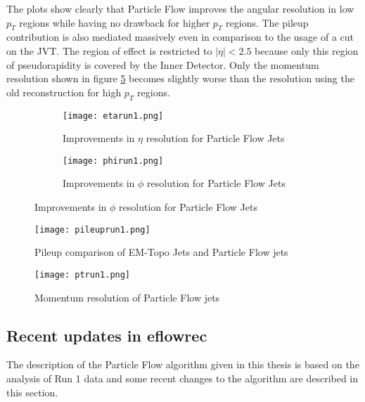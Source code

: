 The plots show clearly that Particle Flow improves the angular resolution in low $p_T$ regions while having no drawback for higher $p_T$ regions. The pileup contribution is also mediated massively even in comparison to the usage of a cut on the JVT. The region of effect is restricted to $|\eta|<\num{2.5}$ because only this region of pseudorapidity is covered by the Inner Detector. Only the momentum resolution shown in figure \ref{fig:ptrun1} becomes slightly worse than the resolution using the old reconstruction for high $p_T$ regions.

\begin{figure}[h]
  \centering
  \begin{subfigure}[b]{0.5\figwidth}
  \texttt{[image: etarun1.png]}
  \caption[Improvements in $\eta$ resolution for Particle Flow Jets]{Improvements in $\eta$ resolution for Particle Flow Jets \cite{pflow16}}
  \label{fig:etarun1}
  \end{subfigure}
  \begin{subfigure}[b]{0.5\figwidth}
  \texttt{[image: phirun1.png]}
  \caption[Improvements in $\phi$ resolution for Particle Flow Jets]{Improvements in $\phi$ resolution for Particle Flow Jets \cite{pflow16}}
  \label{fig:phirun1}
  \end{subfigure}
\end{figure}

\begin{figure}[h]
  \centering
  \texttt{[image: pileuprun1.png]}
  \caption[Pileup comparison of EM-Topo Jets and Particle Flow jets]{Pileup comparison of EM-Topo Jets and Particle Flow jets \cite{pflow16}}
  \label{fig:pileuprun1}
\end{figure}

\begin{figure}
\centering
\texttt{[image: ptrun1.png]}
\caption[Momentum resolution of Particle Flow]{Momentum resolution of Particle Flow jets \cite{pflow16}}
\label{fig:ptrun1}
\end{figure}



\subsection{Recent updates in eflowrec}

The description of the Particle Flow algorithm given in this thesis is based on the analysis of Run 1 data and some recent changes to the algorithm are described in this section.


